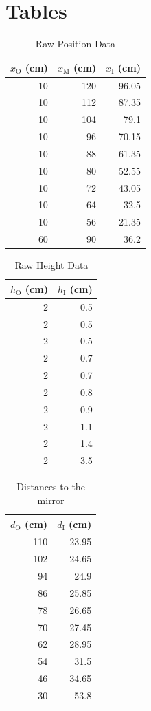 \section{Tables}
%
\begin{table}[ht]
    \centering
    \begin{tabular}{r|r|r}
        $x_{\text{O}}$ (cm) & $x_{\text{M}}$ (cm) & $x_{\text{I}}$ (cm) \\
        \hline
        10 & 120 & 96.05 \\
        10 & 112 & 87.35 \\
        10 & 104 & 79.1 \\
        10 & 96 & 70.15 \\
        10 & 88 & 61.35 \\
        10 & 80 & 52.55 \\
        10 & 72 & 43.05 \\
        10 & 64 & 32.5 \\
        10 & 56 & 21.35 \\
        60 & 90 & 36.2 \\
        \hline
    \end{tabular}
    \caption{Raw Position Data}
    \label{table.07.position}
\end{table}
%
\begin{table}[ht]
    \centering
    \begin{tabular}{r|r}
        $h_{\text{O}}$ (cm) & $h_{\text{I}}$ (cm) \\
        \hline
        2 & 0.5 \\
        2 & 0.5 \\
        2 & 0.5 \\
        2 & 0.7 \\
        2 & 0.7 \\
        2 & 0.8 \\
        2 & 0.9 \\
        2 & 1.1 \\
        2 & 1.4 \\
        2 & 3.5 \\
        \hline
    \end{tabular}
    \caption{Raw Height Data}
    \label{table.07.height}
\end{table}
%
\begin{table}[ht]
    \centering
    \begin{tabular}{r|r}
        $d_{\text{O}}$ (cm) & $d_{\text{I}}$ (cm) \\
        \hline
        110 & 23.95 \\
        102 & 24.65 \\
        94 & 24.9 \\
        86 & 25.85 \\
        78 & 26.65 \\
        70 & 27.45 \\
        62 & 28.95 \\
        54 & 31.5 \\
        46 & 34.65 \\
        30 & 53.8 \\
        \hline
    \end{tabular}
    \caption{Distances to the mirror}
    \label{table.07.distance}
\end{table}
